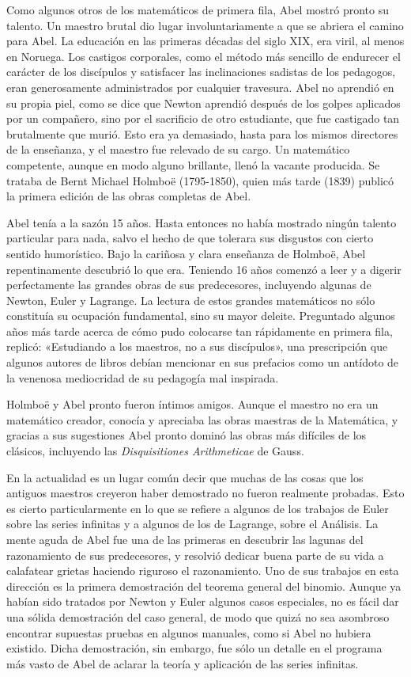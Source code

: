 \documentclass[a4paper, 12pt, draft]{article}
\begin{document}
Como algunos otros de los matemáticos de primera fila, Abel mostró  pronto su talento. Un maestro brutal dio lugar involuntariamente a que se abriera el camino para Abel. La educación en las primeras décadas del siglo XIX, era viril, al menos en Noruega. Los castigos corporales, como el método más sencillo de endurecer el carácter de los discípulos y satisfacer las inclinaciones sadistas de los pedagogos, eran generosamente administrados por cualquier travesura. Abel no aprendió en su propia piel, como se dice que Newton aprendió después de los golpes aplicados por un compañero, sino por el sacrificio de otro estudiante, que fue castigado tan brutalmente que murió. Esto era ya demasiado, hasta para los mismos directores de la enseñanza, y el maestro fue relevado de su cargo. Un matemático competente, aunque en modo alguno brillante, llenó la vacante producida. Se trataba de Bernt Michael Holmboë (1795-1850), quien más tarde (1839) publicó la primera edición de las obras completas de Abel.

Abel tenía a la sazón 15 años. Hasta entonces no había mostrado ningún talento particular para nada, salvo el hecho de que tolerara sus disgustos con cierto sentido humorístico. Bajo la cariñosa y clara enseñanza de Holmboë, Abel repentinamente descubrió lo que era. Teniendo 16 años comenzó a leer y a digerir perfectamente las grandes obras de sus predecesores, incluyendo algunas de Newton, Euler y Lagrange. La lectura de estos grandes matemáticos no sólo constituía su ocupación fundamental, sino su mayor deleite. Preguntado algunos años más tarde acerca de cómo pudo colocarse tan rápidamente en primera fila, replicó: «Estudiando a los maestros, no a sus discípulos», una prescripción que algunos autores de libros debían mencionar en sus prefacios como un antídoto de la venenosa mediocridad de su pedagogía mal inspirada.

Holmboë y Abel pronto fueron íntimos amigos. Aunque el maestro no era un matemático creador, conocía y apreciaba las obras maestras de la Matemática, y gracias a sus sugestiones Abel pronto dominó las obras más difíciles de los clásicos, incluyendo las {\it Disquisitiones Arithmeticae} de Gauss.

En la actualidad es un lugar común decir que muchas de las cosas que los antiguos maestros creyeron haber demostrado no fueron realmente probadas. Esto es cierto particularmente en lo que se refiere a algunos de los trabajos de Euler sobre las series infinitas y a algunos de los de Lagrange, sobre el Análisis. La mente aguda de Abel fue una de las primeras en descubrir las lagunas del razonamiento de sus predecesores, y resolvió dedicar buena parte de su vida a calafatear grietas haciendo riguroso el razonamiento. Uno de sus trabajos en esta dirección es la primera demostración del teorema general del binomio. Aunque ya habían sido tratados por Newton y Euler algunos casos especiales, no es fácil dar una sólida demostración del caso general, de modo que quizá no sea asombroso encontrar supuestas pruebas en algunos manuales, como si Abel no hubiera existido. Dicha demostración, sin embargo, fue sólo un detalle en el programa más vasto de Abel de aclarar la teoría y aplicación de las series infinitas.
\end{document}
